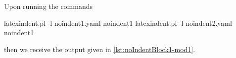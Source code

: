 Upon running the commands
\begin{commandshell}
latexindent.pl -l noindent1.yaml noindent1
latexindent.pl -l noindent2.yaml noindent1
\end{commandshell} then we receive the output given in
\cref{lst:noIndentBlock1-mod1}.
